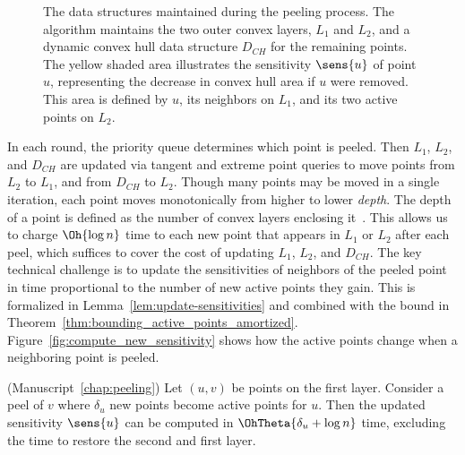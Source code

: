 \begin{figure}[ht]
    \caption{
    The data structures maintained during the peeling process. 
    The algorithm maintains the two outer convex layers, $L_1$ and $L_2$, and a dynamic convex hull data structure $D_{CH}$ for the remaining points. 
    The yellow shaded area illustrates the sensitivity $\sens{u}$ of point $u$, representing the decrease in convex hull area if $u$ were removed. 
    This area is defined by $u$, its neighbors on $L_1$, and its two active points on $L_2$.
    }
    \label{fig:peeling_datastructures_sensitivity}
\end{figure}

In each round, the priority queue determines which point is peeled. 
Then $L_1$, $L_2$, and $D_{CH}$ are updated via tangent and extreme point queries to move points from $L_2$ to $L_1$, and from $D_{CH}$ to $L_2$. 
Though many points may be moved in a single iteration, each point moves monotonically from higher to lower \emph{depth}. 
The depth of a point is defined as the number of convex layers enclosing it~\cite{1057060}. 
This allows us to charge $\Oh{\log n}$ time to each new point that appears in $L_1$ or $L_2$ after each peel, which suffices to cover the cost of updating $L_1$, $L_2$, and $D_{CH}$. 
The key technical challenge is to update the sensitivities of neighbors of the peeled point in time proportional to the number of new active points they gain. This is formalized in Lemma~\ref{lem:update-sensitivities} and combined with the bound in Theorem~\ref{thm:bounding_active_points_amortized}. 
Figure~\ref{fig:compute_new_sensitivity} shows how the active points change when a neighboring point is peeled. 

\begin{lemma}\label{lem:update-sensitivities}(Manuscript~\ref{chap:peeling}) 
    Let $(u, v)$ be points on the first layer. Consider a peel of $v$ where $\delta_u$ new points become active points for $u$.
    Then the updated sensitivity $\sens{u}$ can be computed in $\OhTheta{\delta_u + \log n}$ time, excluding the time to restore the second and first layer.
\end{lemma}


